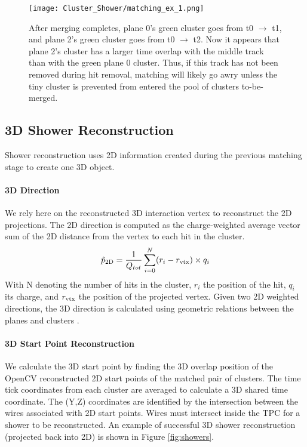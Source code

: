 \begin{figure}[H]
\centering
\texttt{[image: Cluster\_Shower/matching\_ex\_1.png]}
\caption{After merging completes, plane 0’s green cluster goes from t0 $\rightarrow$ t1, and plane 2’s green cluster goes from t0 $\rightarrow$ t2. Now it appears that plane 2’s cluster has a larger time overlap with the middle track than with the green plane 0 cluster.  Thus, if this track has not been removed during hit removal, matching will likely go awry unless the tiny cluster is prevented from entered the pool of clusters to-be-merged.
 }
\label{fig:matching_ex_1}
\end{figure}


\subsection{3D Shower Reconstruction}
Shower reconstruction uses 2D information created during the previous matching stage to create one 3D object. 
\paragraph{3D Direction}  We rely here on the reconstructed 3D interaction vertex to reconstruct the 2D projections. The 2D direction is computed as the charge-weighted average vector sum of the 2D distance from the vertex to each hit in the cluster.
\begin{equation}
  \hat{p}_{\rm 2D} = \frac{1}{Q_{tot}} \sum_{i=0}^{N} (r_i - r_{\rm vtx}) \times q_i 
\end{equation}
With N denoting the number of hits in the cluster, $r_i$ the position of the hit, $q_i$ its charge, and $r_{\rm vtx}$ the position of the projected vertex. Given two 2D weighted directions, the 3D direction is calculated using geometric relations between the planes and clusters \cite{bib:larliteGeoHelper}. 

\paragraph{3D Start Point Reconstruction} We calculate the 3D start point by finding the 3D overlap position of the OpenCV reconstructed 2D start points of the matched pair of clusters. The time tick coordinates from each cluster are averaged to calculate a 3D shared time coordinate. The (Y,Z) coordinates are identified by the intersection between the wires associated with 2D start points.  Wires must intersect inside the TPC for a shower to be reconstructed.  An example of successful 3D shower reconstruction (projected back into 2D) is shown in Figure \ref{fig:showers}.

